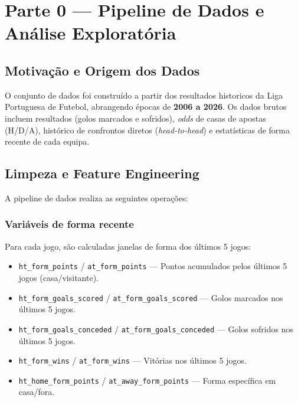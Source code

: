 \documentclass[12pt, a4paper]{article}
\begin{document}
\newpage
\tableofcontents
\newpage

\section{Parte 0 --- Pipeline de Dados e Análise Exploratória}

\subsection{Motivação e Origem dos Dados}

O conjunto de dados foi construído a partir dos resultados historicos da Liga Portuguesa de Futebol, abrangendo épocas de \textbf{2006 a 2026}. Os dados brutos incluem resultados (golos marcados e sofridos), \textit{odds} de casas de apostas (H/D/A), histórico de confrontos diretos (\textit{head-to-head}) e estatísticas de forma recente de cada equipa.

\subsection{Limpeza e Feature Engineering}

A pipeline de dados realiza as seguintes operações:

\subsubsection{Variáveis de forma recente}

Para cada jogo, são calculadas janelas de forma dos últimos 5 jogos:

\begin{itemize}
  \item \texttt{ht\_form\_points} / \texttt{at\_form\_points} — Pontos acumulados pelos últimos 5 jogos (casa/visitante).
  \item \texttt{ht\_form\_goals\_scored} / \texttt{at\_form\_goals\_scored} — Golos marcados nos últimos 5 jogos.
  \item \texttt{ht\_form\_goals\_conceded} / \texttt{at\_form\_goals\_conceded} — Golos sofridos nos últimos 5 jogos.
  \item \texttt{ht\_form\_wins} / \texttt{at\_form\_wins} — Vitórias nos últimos 5 jogos.
  \item \texttt{ht\_home\_form\_points} / \texttt{at\_away\_form\_points} — Forma específica em casa/fora.
\end{itemize}
\end{document}
